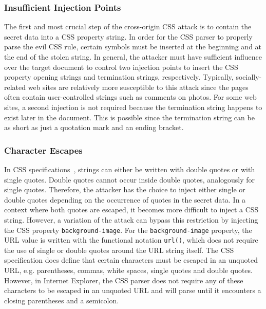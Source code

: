 \documentclass{acm_proc_article-sp}
\begin{document}
\subsubsection{Insufficient Injection Points}
The first and most crucial step of the cross-origin CSS attack is to contain the secret data into a CSS property string. In order for the CSS parser to properly parse the evil CSS rule, certain symbols must be inserted at the beginning and at the end of the stolen string. In general, the attacker must have sufficient influence over the target document to control two injection points to insert the CSS property opening strings and termination strings, respectively. Typically, socially-related web sites are relatively more susceptible to this attack since the pages often contain user-controlled strings such as comments on photos. For some web sites, a second injection is not required because the termination string happens to exist later in the document. This is possible since the termination string can be as short as just a quotation mark and an ending bracket. 

\subsubsection{Character Escapes}
In CSS specifications~\cite{css}, strings can either be written with double quotes or with single quotes. Double quotes cannot occur inside double quotes, analogously for single quotes. Therefore, the attacker has the choice to inject either single or double quotes depending on the occurrence of quotes in the secret data. In a context where both quotes are escaped, it becomes more difficult to inject a CSS string. However, a variation of the attack  can bypass this restriction by injecting the CSS property \texttt{background-image}. For the \texttt{background-image} property, the URL value is written with the functional notation \texttt{url()}, which does not require the use of single or double quotes around the URL string itself. The CSS specification does define that certain characters must be escaped in an unquoted URL, e.g. parentheses, commas, white spaces, single quotes and double quotes. However, in Internet Explorer, the CSS parser does not require any of these characters to be escaped in an unquoted URL and will parse until it encounters a closing parentheses and a semicolon.
\end{document}
